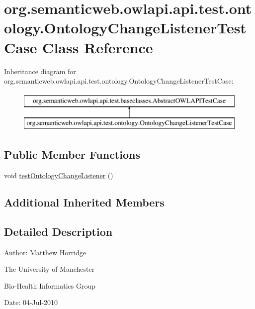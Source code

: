 \hypertarget{classorg_1_1semanticweb_1_1owlapi_1_1api_1_1test_1_1ontology_1_1_ontology_change_listener_test_case}{\section{org.\-semanticweb.\-owlapi.\-api.\-test.\-ontology.\-Ontology\-Change\-Listener\-Test\-Case Class Reference}
\label{classorg_1_1semanticweb_1_1owlapi_1_1api_1_1test_1_1ontology_1_1_ontology_change_listener_test_case}
}
Inheritance diagram for org.\-semanticweb.\-owlapi.\-api.\-test.\-ontology.\-Ontology\-Change\-Listener\-Test\-Case\-:\begin{figure}[H]
\begin{center}
\leavevmode
\includegraphics[height=2.000000cm]{classorg_1_1semanticweb_1_1owlapi_1_1api_1_1test_1_1ontology_1_1_ontology_change_listener_test_case}
\end{center}
\end{figure}
\subsection*{Public Member Functions}
\begin{DoxyCompactItemize}
\item 
void \hyperlink{classorg_1_1semanticweb_1_1owlapi_1_1api_1_1test_1_1ontology_1_1_ontology_change_listener_test_case_a562dc11383e6ba21e29af79ea54b0166}{test\-Ontology\-Change\-Listener} ()
\end{DoxyCompactItemize}
\subsection*{Additional Inherited Members}


\subsection{Detailed Description}
Author\-: Matthew Horridge\par
 The University of Manchester\par
 Bio-\/\-Health Informatics Group\par
 Date\-: 04-\/\-Jul-\/2010 

